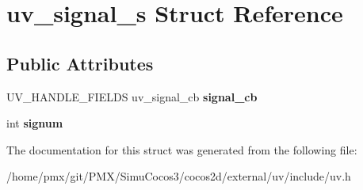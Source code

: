 \hypertarget{structuv__signal__s}{}\section{uv\+\_\+signal\+\_\+s Struct Reference}
\label{structuv__signal__s}
\subsection*{Public Attributes}
\begin{DoxyCompactItemize}
\item 
\mbox{\label{structuv__signal__s_abe06e2ec8944818bb2e7886a166468d8}} 
U\+V\+\_\+\+H\+A\+N\+D\+L\+E\+\_\+\+F\+I\+E\+L\+DS uv\+\_\+signal\+\_\+cb {\bfseries signal\+\_\+cb}
\item 
\mbox{\label{structuv__signal__s_ab25f2d111730c7e98bbdc554d7840c3c}} 
int {\bfseries signum}
\end{DoxyCompactItemize}


The documentation for this struct was generated from the following file\+:\begin{DoxyCompactItemize}
\item 
/home/pmx/git/\+P\+M\+X/\+Simu\+Cocos3/cocos2d/external/uv/include/uv.\+h\end{DoxyCompactItemize}

